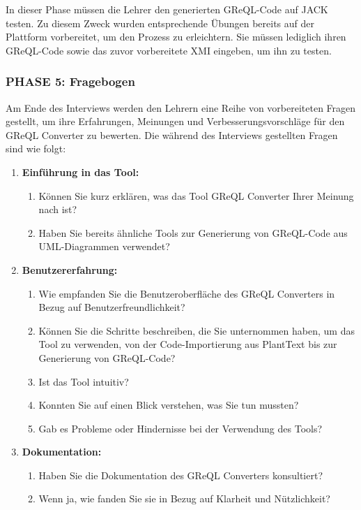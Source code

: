 In dieser Phase müssen die Lehrer den generierten GReQL-Code auf JACK testen. Zu diesem Zweck wurden entsprechende
Übungen bereits auf der Plattform vorbereitet, um den Prozess zu erleichtern. Sie müssen lediglich ihren GReQL-Code
sowie das zuvor vorbereitete XMI eingeben, um ihn zu testen.

\subsubsection{PHASE 5: Fragebogen}

Am Ende des Interviews werden den Lehrern eine Reihe von vorbereiteten Fragen gestellt, um ihre Erfahrungen, Meinungen
und Verbesserungsvorschläge für den GReQL Converter zu bewerten. Die während des Interviews gestellten Fragen sind
wie folgt:

\begin{enumerate}
    \item \textbf{Einführung in das Tool:}
    \begin{enumerate}
        \item Können Sie kurz erklären, was das Tool GReQL Converter Ihrer Meinung nach ist?
        \item Haben Sie bereits ähnliche Tools zur Generierung von GReQL-Code aus UML-Diagrammen verwendet?
    \end{enumerate}
    \item \textbf{Benutzererfahrung:}
    \begin{enumerate}
        \item Wie empfanden Sie die Benutzeroberfläche des GReQL Converters in Bezug auf Benutzerfreundlichkeit?
        \item Können Sie die Schritte beschreiben, die Sie unternommen haben, um das Tool zu verwenden, von der
        Code-Importierung aus PlantText bis zur Generierung von GReQL-Code?
        \item Ist das Tool intuitiv?
        \item Konnten Sie auf einen Blick verstehen, was Sie tun mussten?
        \item Gab es Probleme oder Hindernisse bei der Verwendung des Tools?
    \end{enumerate}
    \item \textbf{Dokumentation:}
    \begin{enumerate}
        \item Haben Sie die Dokumentation des GReQL Converters konsultiert?
        \item Wenn ja, wie fanden Sie sie in Bezug auf Klarheit und Nützlichkeit?

\end{enumerate}
\end{enumerate}
